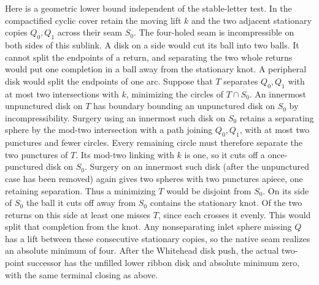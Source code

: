 \documentclass[11pt,letterpaper]{article}
\numberwithin{equation}{section}
\theoremstyle{remark}
\begin{document}
Here is a geometric lower bound independent of the stable-letter test.
In the compactified cyclic cover retain the moving lift \(k\) and the
two adjacent stationary copies \(Q_0,Q_1\) across their seam \(S_0\).
The four-holed seam is incompressible on both sides of this sublink.
A disk on a side would cut its ball into two balls. It cannot split
the endpoints of a return, and separating the two whole returns
would put one completion in a ball away from the stationary knot.
A peripheral disk would split the endpoints of one arc.
Suppose that \(T\) separates \(Q_0,Q_1\) with at most two intersections
with \(k\), minimizing the circles of \(T\cap S_0\). An innermost
unpunctured disk on \(T\) has boundary bounding an unpunctured disk on
\(S_0\) by incompressibility. Surgery using an innermost such disk on
\(S_0\) retains a separating sphere by the mod-two intersection with
a path joining \(Q_0,Q_1\), with at most two punctures and fewer
circles. Every remaining circle must therefore separate the two
punctures of \(T\). Its mod-two linking with \(k\) is one, so it
cuts off a once-punctured disk on \(S_0\). Surgery on an innermost
such disk (after the unpunctured case has been removed) again gives
two spheres with two punctures apiece, one
retaining separation. Thus a minimizing \(T\) would be disjoint from
\(S_0\). On its side of \(S_0\) the ball it cuts off away from \(S_0\)
contains the stationary knot. Of the two returns on this side at least
one misses \(T\), since each crosses it evenly. This would split that
completion from the knot. Any nonseparating inlet sphere missing \(Q\)
has a lift between these consecutive stationary copies, so the native
seam realizes an absolute minimum of four. After the Whitehead disk
push, the actual two-point successor has the unfilled lower ribbon disk
and absolute minimum zero, with the same terminal closing as above.
\end{document}
